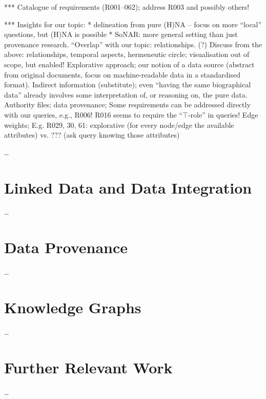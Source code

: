 *** Catalogue of requirements (R001--062); address R003 and possibly others!



*** Insights for our topic:
* delineation from pure (H)NA -- focus on more \enquote{local} questions, but (H)NA is possible
* SoNAR: 
  more general setting than just provenance research. \enquote{Overlap} with our topic:
  relationships. (?)
  Discuss from the above: relationships, temporal aspects, hermeneutic circle; visualisation out of scope, but enabled!
  Explorative approach; our notion of a data source (abstract from original documents, focus on machine-readable data in a standardised format).
  Indirect information (substitute); even \enquote{having the same biographical data} already involves some interpretation of, or reasoning on, the pure data.
  Authority files; data provenance;
  Some requirements can be addressed directly with our queries, e.g., R006!
  R016 seems to require the \enquote{$\top$-role} in queries!
  Edge weights;
  E.g. R029, 30, 61: explorative (for every node/edge the available attributes) vs. ??? (ask query knowing those attributes)



\dots

\section{Linked Data and Data Integration}
\label{sec:linked_data+integration}

\dots


\section{Data Provenance}
\label{sec:data_provenance}

\dots


\section{Knowledge Graphs}
\label{sec:KGs}

\dots


\section{Further Relevant Work}
\label{sec:further}

\dots


